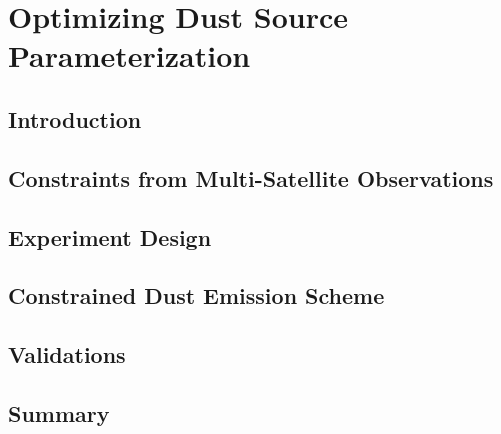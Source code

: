 \chapter{Optimizing Dust Source Parameterization}

\section{Introduction}

\section{Constraints from Multi-Satellite Observations}

\section{Experiment Design}

\section{Constrained Dust Emission Scheme}

\section{Validations}

\section{Summary}
